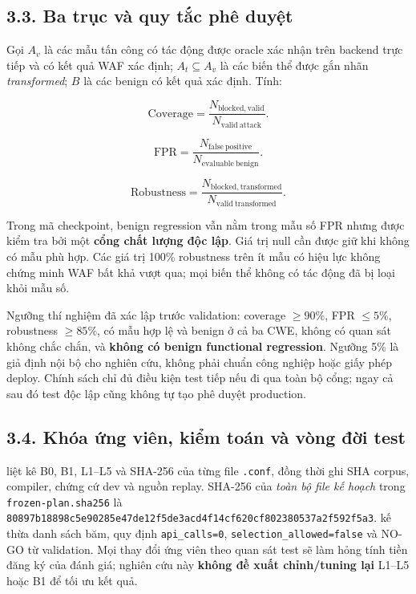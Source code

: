 \documentclass[
  10pt,
  a4paper,
]{article}
\begin{document}
\subsection{3.3. Ba trục và quy tắc phê
duyệt}\label{ba-trux1ee5c-vuxe0-quy-tux1eafc-phuxea-duyux1ec7t}

Gọi \(A_v\) là các mẫu tấn công có tác động được oracle xác nhận trên
backend trực tiếp và có kết quả WAF xác định; \(A_t\subseteq A_v\) là
các biến thể được gắn nhãn \emph{transformed}; \(B\) là các benign có
kết quả xác định. Tính:

\[
\mathrm{Coverage}=\frac{N_{\mathrm{blocked,valid}}}{N_{\mathrm{valid\ attack}}}.
\]

\[
\mathrm{FPR}=\frac{N_{\mathrm{false\ positive}}}{N_{\mathrm{evaluable\ benign}}}.
\]

\[
\mathrm{Robustness}=\frac{N_{\mathrm{blocked,transformed}}}{N_{\mathrm{valid\ transformed}}}.
\]

Trong mã checkpoint, benign regression vẫn nằm trong mẫu số FPR nhưng
được kiểm tra bởi một \textbf{cổng chất lượng độc lập}. Giá trị null cần
được giữ khi không có mẫu phù hợp. Các giá trị 100\% robustness trên ít
mẫu có hiệu lực không chứng minh WAF bất khả vượt qua; mọi biến thể
không có tác động đã bị loại khỏi mẫu số.

Ngưỡng thí nghiệm đã xác lập trước validation: coverage \(\geq 90\%\),
FPR \(\leq 5\%\), robustness \(\geq 85\%\), có mẫu hợp lệ và benign ở cả
ba CWE, không có quan sát không chắc chắn, và \textbf{không có benign
functional regression}. Ngưỡng 5\% là giả định nội bộ cho nghiên cứu,
không phải chuẩn công nghiệp hoặc giấy phép deploy. Chính sách chỉ đủ
điều kiện test tiếp nếu đi qua toàn bộ cổng; ngay cả sau đó test độc lập
cũng không tự tạo phê duyệt production.

\subsection{3.4. Khóa ứng viên, kiểm toán và vòng đời
test}\label{khuxf3a-ux1ee9ng-viuxean-kiux1ec3m-touxe1n-vuxe0-vuxf2ng-ux111ux1eddi-test}

liệt kê B0, B1, L1--L5 và SHA-256 của từng file \texttt{.conf}, đồng
thời ghi SHA corpus, compiler, chứng cứ dev và nguồn replay. SHA-256 của
\emph{toàn bộ file kế hoạch} trong \texttt{frozen-plan.sha256} là
\texttt{80897b18898c5e90\allowbreak{}285e47de12f5de3a\allowbreak{}cd4f14cf620cf802\allowbreak{}380537a2f592f5a3}.
 kế thừa danh
sách băm, quy định \texttt{api\_calls=0},
\texttt{selection\_allowed=false} và NO-GO từ validation. Mọi thay đổi
ứng viên theo quan sát test sẽ làm hỏng tính tiền đăng ký của đánh giá;
nghiên cứu này \textbf{không đề xuất chỉnh/tuning lại} L1--L5 hoặc B1 để
tối ưu kết quả.
\end{document}

